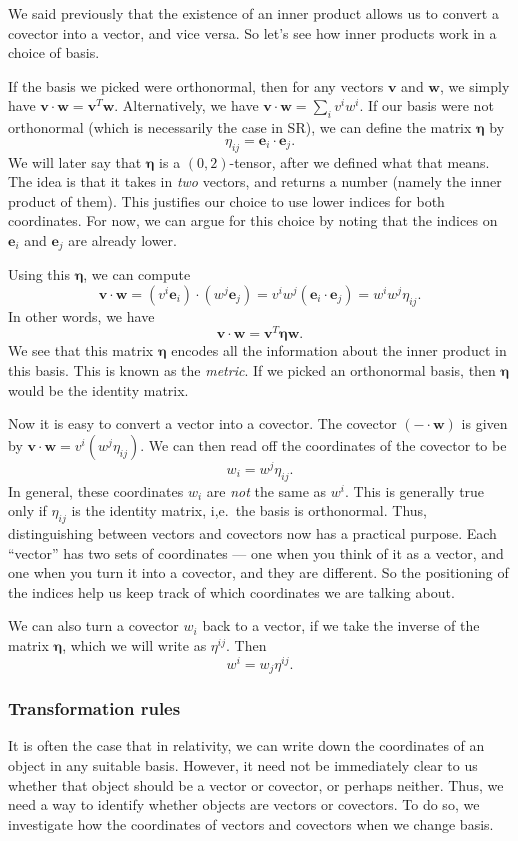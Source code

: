 \documentclass[a4paper]{article}
\begin{document}
We said previously that the existence of an inner product allows us to convert a covector into a vector, and vice versa. So let's see how inner products work in a choice of basis.

If the basis we picked were orthonormal, then for any vectors $\mathbf{v}$ and $\mathbf{w}$, we simply have $\mathbf{v} \cdot \mathbf{w} = \mathbf{v}^T \mathbf{w}$. Alternatively, we have $\mathbf{v} \cdot \mathbf{w} = \sum_i v^i w^i$. If our basis were not orthonormal (which is necessarily the case in SR), we can define the matrix $\boldsymbol\eta$ by
\[
  \eta_{ij} = \mathbf{e}_i \cdot \mathbf{e}_j.
\]
We will later say that $\boldsymbol\eta$ is a $(0, 2)$-tensor, after we defined what that means. The idea is that it takes in \emph{two} vectors, and returns a number (namely the inner product of them). This justifies our choice to use lower indices for both coordinates. For now, we can argue for this choice by noting that the indices on $\mathbf{e}_i$ and $\mathbf{e}_j$ are already lower.

Using this $\boldsymbol\eta$, we can compute
\[
  \mathbf{v} \cdot \mathbf{w} = (v^i \mathbf{e}_i) \cdot (w^j \mathbf{e}_j) = v^i w^j (\mathbf{e}_i \cdot \mathbf{e}_j) = w^i w^j \eta_{ij}.
\]
In other words, we have
\[
  \mathbf{v} \cdot \mathbf{w} = \mathbf{v}^T \boldsymbol\eta \mathbf{w}.
\]
We see that this matrix $\boldsymbol\eta$ encodes all the information about the inner product in this basis. This is known as the \emph{metric}. If we picked an orthonormal basis, then $\boldsymbol\eta$ would be the identity matrix.

Now it is easy to convert a vector into a covector. The covector $(-\cdot \mathbf{w})$ is given by $\mathbf{v} \cdot \mathbf{w} = v^i (w^j\eta_{ij})$. We can then read off the coordinates of the covector to be
\[
  w_i = w^j \eta_{ij}.
\]
In general, these coordinates $w_i$ are \emph{not} the same as $w^i$. This is generally true only if $\eta_{ij}$ is the identity matrix, i,e.\ the basis is orthonormal. Thus, distinguishing between vectors and covectors now has a practical purpose. Each ``vector'' has two sets of coordinates --- one when you think of it as a vector, and one when you turn it into a covector, and they are different. So the positioning of the indices help us keep track of which coordinates we are talking about.

We can also turn a covector $w_i$ back to a vector, if we take the inverse of the matrix $\boldsymbol\eta$, which we will write as $\eta^{ij}$. Then
\[
  w^i = w_j \eta^{ij}.
\]
\subsubsection{Transformation rules}
It is often the case that in relativity, we can write down the coordinates of an object in any suitable basis. However, it need not be immediately clear to us whether that object should be a vector or covector, or perhaps neither. Thus, we need a way to identify whether objects are vectors or covectors. To do so, we investigate how the coordinates of vectors and covectors when we change basis.
\end{document}
